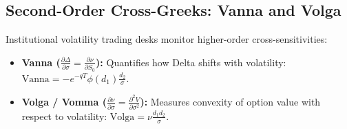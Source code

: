 \subsection{Second-Order Cross-Greeks: Vanna and Volga}

Institutional volatility trading desks monitor higher-order cross-sensitivities:
\begin{itemize}[leftmargin=1.5em, itemsep=1pt, parsep=0pt]
    \item \textbf{Vanna ($\frac{\partial \Delta}{\partial \sigma} = \frac{\partial \nu}{\partial S_0}$):} Quantifies how Delta shifts with volatility: $\text{Vanna} = -e^{-qT} \phi(d_1) \frac{d_2}{\sigma}$.
    \item \textbf{Volga / Vomma ($\frac{\partial \nu}{\partial \sigma} = \frac{\partial^2 V}{\partial \sigma^2}$):} Measures convexity of option value with respect to volatility: $\text{Volga} = \nu \frac{d_1 d_2}{\sigma}$.
\end{itemize}

\clearpage
